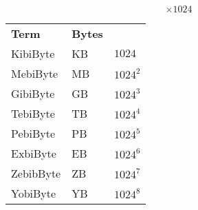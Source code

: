 \documentclass{report}
\begin{document}
            \hfill
            \begin{minipage}[t]{0.3\textwidth}
                \[\times 1024\]
                \begin{center}
                    \begin{tabular}{l l l}
                        \textbf{Term} & \textbf{Bytes} \\
                        KibiByte  & KB & $1024$ \\
                        MebiByte  & MB & $1024^2$ \\
                        GibiByte  & GB & $1024^3$ \\
                        TebiByte  & TB & $1024^4$ \\
                        PebiByte  & PB & $1024^5$ \\
                        ExbiByte  & EB & $1024^6$ \\
                        ZebibByte & ZB & $1024^7$ \\
                        YobiByte  & YB & $1024^8$ \\
                    \end{tabular}
                \end{center}
            \end{minipage}
\end{document}

